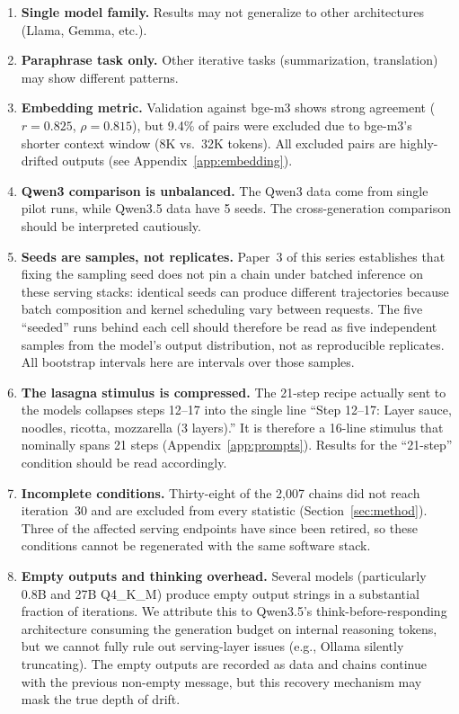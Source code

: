 \documentclass[11pt]{article}
\begin{document}
\begin{enumerate}[leftmargin=*]
  \item \textbf{Single model family.} Results may not generalize to other
        architectures (Llama, Gemma, etc.).
  \item \textbf{Paraphrase task only.} Other iterative tasks (summarization,
        translation) may show different patterns.
  \item \textbf{Embedding metric.} Validation against bge-m3 shows strong
        agreement ($r = 0.825$, $\rho = 0.815$), but 9.4\% of pairs
        were excluded due to bge-m3's shorter context window (8K vs.\ 32K
        tokens). All excluded pairs are highly-drifted outputs
        (see Appendix~\ref{app:embedding}).
  \item \textbf{Qwen3 comparison is unbalanced.} The Qwen3 data come from
        single pilot runs, while Qwen3.5 data have 5 seeds. The
        cross-generation comparison should be interpreted cautiously.
  \item \textbf{Seeds are samples, not replicates.} Paper~3 of this series
        establishes that fixing the sampling seed does not pin a chain
        under batched inference on these serving stacks: identical seeds
        can produce different trajectories because batch composition and
        kernel scheduling vary between requests. The five ``seeded'' runs
        behind each cell should therefore be read as five independent
        samples from the model's output distribution, not as reproducible
        replicates. All bootstrap intervals here are intervals over those
        samples.
  \item \textbf{The lasagna stimulus is compressed.} The 21-step recipe
        actually sent to the models collapses steps 12--17 into the single
        line ``Step 12--17: Layer sauce, noodles, ricotta, mozzarella
        (3 layers).'' It is therefore a 16-line stimulus that nominally
        spans 21 steps (Appendix~\ref{app:prompts}). Results for the
        ``21-step'' condition should be read accordingly.
  \item \textbf{Incomplete conditions.} Thirty-eight of the 2{,}007 chains
        did not reach iteration~30 and are excluded from every statistic
        (Section~\ref{sec:method}). Three of the affected serving
        endpoints have since been retired, so these conditions cannot be
        regenerated with the same software stack.
  \item \textbf{Empty outputs and thinking overhead.} Several models
        (particularly 0.8B and 27B Q4\_K\_M) produce empty output strings
        in a substantial fraction of iterations. We attribute this to
        Qwen3.5's think-before-responding architecture consuming the
        generation budget on internal reasoning tokens, but we cannot
        fully rule out serving-layer issues (e.g., Ollama silently
        truncating). The empty outputs are recorded as data and chains
        continue with the previous non-empty message, but this recovery
        mechanism may mask the true depth of drift.
\end{enumerate}
\end{document}
